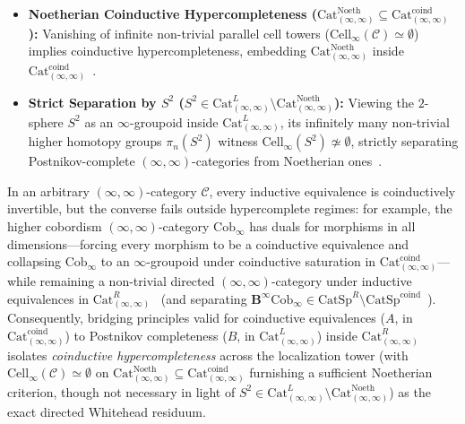 \begin{itemize}

  \item \textbf{Noetherian Coinductive Hypercompleteness ($\mathrm{Cat}^{\mathrm{Noeth}}_{(\infty, \infty)} \subseteq \mathrm{Cat}^{\mathrm{coind}}_{(\infty, \infty)}$):} Vanishing of infinite non-trivial parallel cell towers ($\mathrm{Cell}_\infty(\mathcal{C}) \simeq \emptyset$) implies coinductive hypercompleteness, embedding $\mathrm{Cat}^{\mathrm{Noeth}}_{(\infty, \infty)}$ inside $\mathrm{Cat}^{\mathrm{coind}}_{(\infty, \infty)}$~\cite{Goldthorpe23,ORW26,GepnerHeine26}.

  \item \textbf{Strict Separation by $S^2$ ($S^2 \in \mathrm{Cat}^L_{(\infty, \infty)} \setminus \mathrm{Cat}^{\mathrm{Noeth}}_{(\infty, \infty)}$):} Viewing the $2$-sphere $S^2$ as an $\infty$-groupoid inside $\mathrm{Cat}^L_{(\infty, \infty)}$, its infinitely many non-trivial higher homotopy groups $\pi_n(S^2)$ witness $\mathrm{Cell}_\infty(S^2) \not\simeq \emptyset$, strictly separating Postnikov-complete $(\infty, \infty)$-categories from Noetherian ones~\cite{ORW26,GepnerHeine26}.

\end{itemize}

In an arbitrary $(\infty, \infty)$-category $\mathcal{C}$, every inductive equivalence is coinductively invertible, but the converse fails outside hypercomplete regimes: for example, the higher cobordism $(\infty, \infty)$-category $\mathrm{Cob}_\infty$ has duals for morphisms in all dimensions---forcing every morphism to be a coinductive equivalence and collapsing $\mathrm{Cob}_\infty$ to an $\infty$-groupoid under coinductive saturation in $\mathrm{Cat}^{\mathrm{coind}}_{(\infty, \infty)}$---while remaining a non-trivial directed $(\infty, \infty)$-category under inductive equivalences in $\mathrm{Cat}^R_{(\infty, \infty)}$~\cite{ORW26,GepnerHeine26} (and separating $\mathbf{B}^\infty \mathrm{Cob}_\infty \in \mathrm{CatSp}^R \setminus \mathrm{CatSp}^{\mathrm{coind}}$~\cite{Masuda26,Heine26}). Consequently, bridging principles valid for coinductive equivalences ($A$, in $\mathrm{Cat}^{\mathrm{coind}}_{(\infty, \infty)}$) to Postnikov completeness ($B$, in $\mathrm{Cat}^L_{(\infty, \infty)}$) inside $\mathrm{Cat}^R_{(\infty, \infty)}$ isolates \emph{coinductive hypercompleteness} across the localization tower (with $\mathrm{Cell}_\infty(\mathcal{C}) \simeq \emptyset$ on $\mathrm{Cat}^{\mathrm{Noeth}}_{(\infty, \infty)} \subseteq \mathrm{Cat}^{\mathrm{coind}}_{(\infty, \infty)}$ furnishing a sufficient Noetherian criterion, though not necessary in light of $S^2 \in \mathrm{Cat}^L_{(\infty, \infty)} \setminus \mathrm{Cat}^{\mathrm{Noeth}}_{(\infty, \infty)}$) as the exact directed Whitehead residuum.

